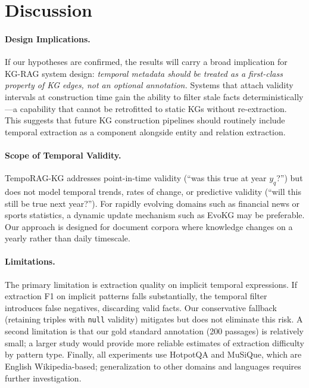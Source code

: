 \documentclass[11pt]{article}
\begin{document}
\section{Discussion}

\paragraph{Design Implications.}
If our hypotheses are confirmed, the results will carry a broad implication
for KG-RAG system design: \textit{temporal metadata should be treated as a
first-class property of KG edges, not an optional annotation.} Systems that
attach validity intervals at construction time gain the ability to filter
stale facts deterministically---a capability that cannot be retrofitted to
static KGs without re-extraction. This suggests that future KG construction
pipelines should routinely include temporal extraction as a component
alongside entity and relation extraction.

\paragraph{Scope of Temporal Validity.}
TempoRAG-KG addresses point-in-time validity (``was this true at year
$y_q$?'') but does not model temporal trends, rates of change, or
predictive validity (``will this still be true next year?''). For rapidly
evolving domains such as financial news or sports statistics, a dynamic
update mechanism such as EvoKG \cite{evoreasonerevokg2025} may be
preferable. Our approach is designed for document corpora where knowledge
changes on a yearly rather than daily timescale.

\paragraph{Limitations.}
The primary limitation is extraction quality on implicit temporal
expressions. If extraction F1 on implicit patterns falls substantially,
the temporal filter introduces false negatives, discarding valid facts.
Our conservative fallback (retaining triples with \texttt{null} validity)
mitigates but does not eliminate this risk. A second limitation is that
our gold standard annotation (200 passages) is relatively small; a
larger study would provide more reliable estimates of extraction difficulty
by pattern type. Finally, all experiments use HotpotQA and MuSiQue, which
are English Wikipedia-based; generalization to other domains and languages
requires further investigation.
\end{document}
